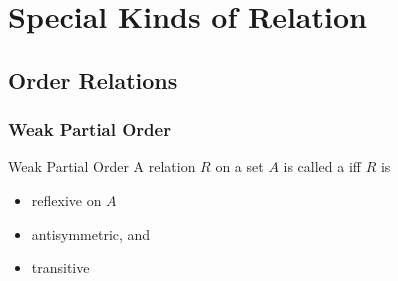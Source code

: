 \documentclass[../notes.tex]{subfiles}
\begin{document}
	\ifSubfilesClassLoaded{\setcounter{chapter}{5}}{}
	\chapter{Special Kinds of Relation}
		\section{Order Relations}
			\subsection{Weak Partial Order}
				\begin{definition}[width=0.68\textwidth]{Weak Partial Order}
					A relation $R$ on a set $A$ is called a  iff $R$ is
					\begin{itemize}[nosep]
						\item reflexive on $A$
						\item antisymmetric, and
						\item transitive
					\end{itemize}
				\end{definition}
\end{document}
